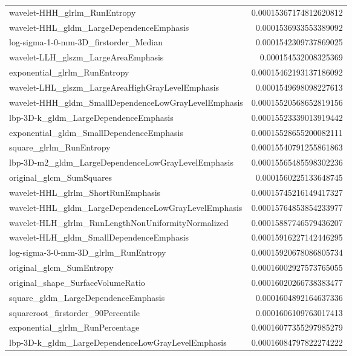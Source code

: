 {\begin{xltabular}[H]{\textwidth}{X r}
        wavelet-HHH\_glrlm\_RunEntropy & 0.00015367174812620812 \\
        wavelet-HHL\_gldm\_LargeDependenceEmphasis & 0.0001536933553389092 \\
        log-sigma-1-0-mm-3D\_firstorder\_Median & 0.0001542309737869025 \\
        wavelet-LLH\_glszm\_LargeAreaEmphasis & 0.000154532008325369 \\
        exponential\_glrlm\_RunEntropy & 0.00015462193137186092 \\
        wavelet-LHL\_glszm\_LargeAreaHighGrayLevelEmphasis & 0.0001549698098227613 \\
        wavelet-HHH\_gldm\_SmallDependenceLowGrayLevelEmphasis & 0.00015520568652819156 \\
        lbp-3D-k\_gldm\_LargeDependenceEmphasis & 0.00015523339013919442 \\
        exponential\_gldm\_SmallDependenceEmphasis & 0.00015528655200082111 \\
        square\_glrlm\_RunEntropy & 0.00015540791255861863 \\
        lbp-3D-m2\_gldm\_LargeDependenceLowGrayLevelEmphasis & 0.00015565485598302236 \\
        original\_glcm\_SumSquares & 0.0001560225133648745 \\
        wavelet-HHL\_glrlm\_ShortRunEmphasis & 0.00015745216149417327 \\
        wavelet-HHL\_gldm\_LargeDependenceLowGrayLevelEmphasis & 0.00015764853854233977 \\
        wavelet-HLH\_glrlm\_RunLengthNonUniformityNormalized & 0.00015887746579436207 \\
        wavelet-HLH\_gldm\_SmallDependenceEmphasis & 0.00015916227142446295 \\
        log-sigma-3-0-mm-3D\_glrlm\_RunEntropy & 0.00015920678086805734 \\
        original\_glcm\_SumEntropy & 0.00016002927573765055 \\
        original\_shape\_SurfaceVolumeRatio & 0.00016020266738383477 \\
        square\_gldm\_LargeDependenceEmphasis & 0.0001604892164637336 \\
        squareroot\_firstorder\_90Percentile & 0.0001606109763017413 \\
        exponential\_glrlm\_RunPercentage & 0.00016077355297985279 \\
        lbp-3D-k\_gldm\_LargeDependenceLowGrayLevelEmphasis & 0.00016084797822274222 \\

\end{xltabular}}
